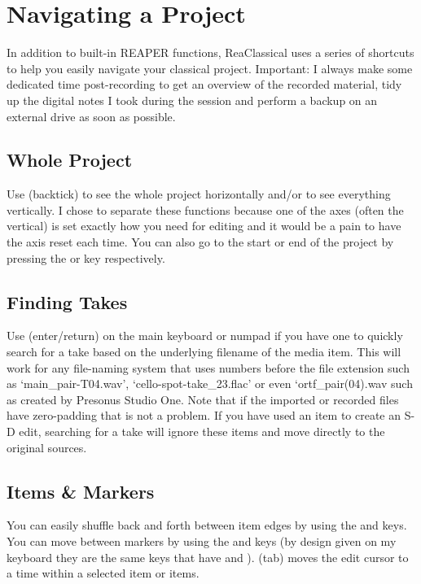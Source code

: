 \documentclass[10pt,american]{article}
\begin{document}
\section{Navigating a Project}

In addition to built-in REAPER functions, ReaClassical uses a series of
shortcuts to help you easily navigate your classical project. Important: I
always make some dedicated time post-recording to get an overview of the
recorded material, tidy up the digital notes I took during the session and
perform a backup on an external drive as soon as possible.

\subsection{Whole Project}

Use  (backtick) to see the whole project horizontally and/or
 to see everything vertically. I chose to separate these functions
because one of the axes (often the vertical) is set exactly how you need for
editing and it would be a pain to have the axis reset each time. You can also go
to the start or end of the project by pressing the  or  key
respectively. 

\subsection{Finding Takes}

Use \keys{\return} (enter/return) on the main keyboard or numpad if you have one
to quickly search for a take based on the underlying filename of the media item.
This will work for any file-naming system that uses numbers before the file
extension such as `main\_pair-T04.wav', `cello-spot-take\_23.flac' or even
`ortf\_pair(04).wav such as created by Presonus Studio One. Note that if the
imported or recorded files have zero-padding that is not a problem. If you have
used an item to create an S-D edit, searching for a take will ignore these items
and move directly to the original sources.

\subsection{Items \& Markers}

You can easily shuffle back and forth between item edges by using the 
and  keys. You can move between markers by using the \keys{,} and
 keys (by design given on my keyboard they are the same keys that have
\keys{<} and \keys{>}). \keys{\tab} (tab) moves the edit cursor to a time within
a selected item or items. 
\end{document}
